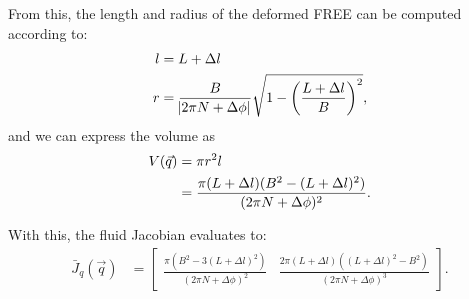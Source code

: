 From this, the length and radius of the deformed FREE can be computed according to:
\begin{align}
    l &= L + \Delta l \label{eq:l} \\
	r &= \frac{B}{\abs{2 \pi N + \Delta \phi}} \sqrt{1 - \left( \frac{L+\Delta l}{B} \right)^2}, \label{eq:r}
\end{align}
and we can express the volume as
\begin{align}
	V(\vec{q}) &= \pi r^2 l \notag \\ 
	&= \frac{\pi (L+\Delta l) (B^2 - (L+\Delta l)^2)}{(2 \pi N + \Delta \phi)^2}  \label{eq:V}.
\end{align}

With this, the fluid Jacobian evaluates to:
\begin{align}
    \bar{J}_q (\vec{q})
    &= \begin{bmatrix} 
		        \frac{\pi \left( B^2 - 3(L + \Delta l)^2 \right)}{(2 \pi N + \Delta \phi)^2} & \frac{2 \pi (L+\Delta l) \left( (L+\Delta l)^2 - B^2 \right)}{(2 \pi N + \Delta \phi)^3}
		\end{bmatrix}.    \label{eq:Jv}
\end{align}






